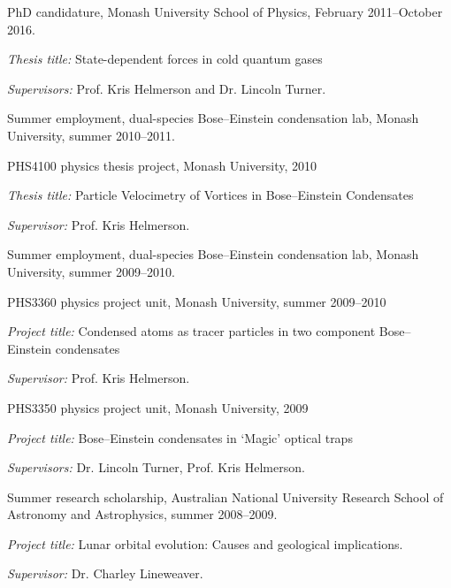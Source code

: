 \documentclass[10pt,letterpaper]{article}
\renewenvironment{itemize}{
  \begin{list}{}{
    \setlength{\leftmargin}{1.5em}
    \setlength{\itemsep}{0.25em}
    \setlength{\parskip}{0pt}
    \setlength{\parsep}{0.25em}
  }
}{
  \end{list}
}
\begin{document}
\begin{itemize}
\item{PhD candidature, Monash University School of Physics, February 2011--October 2016.}
    \begin{itemize}
      \item \textit{Thesis title:}
      State-dependent forces in cold quantum gases
      \item\textit{Supervisors:}
      Prof. Kris Helmerson and Dr. Lincoln Turner.
    \end{itemize}
\item Summer employment, dual-species Bose--Einstein condensation lab, Monash University, summer 2010--2011.
\item PHS4100 physics thesis project, Monash University, 2010
    \begin{itemize}
      \item \textit{Thesis title:}
      Particle Velocimetry of Vortices in Bose--Einstein Condensates
      \item\textit{Supervisor:}
      Prof. Kris Helmerson.
    \end{itemize}
\item Summer employment, dual-species Bose--Einstein condensation lab, Monash University, summer 2009--2010.
\item PHS3360 physics project unit, Monash University, summer 2009--2010
    \begin{itemize}
      \item \textit{Project title:}
      Condensed atoms as tracer particles in two component Bose--Einstein condensates
      \item\textit{Supervisor:}
      Prof. Kris Helmerson.
    \end{itemize}
\item PHS3350 physics project unit, Monash University, 2009
    \begin{itemize}
      \item \textit{Project title:}
      Bose--Einstein condensates in `Magic' optical traps
      \item\textit{Supervisors:}
      Dr. Lincoln Turner, Prof. Kris Helmerson.
    \end{itemize}    
\item Summer research scholarship, Australian National University Research School of Astronomy and Astrophysics, summer 2008--2009.
    \begin{itemize}
      \item \textit{Project title:}
      Lunar orbital evolution: Causes and geological implications.
      \item\textit{Supervisor:}
      Dr. Charley Lineweaver.
    \end{itemize}

\end{itemize}
\end{document}
